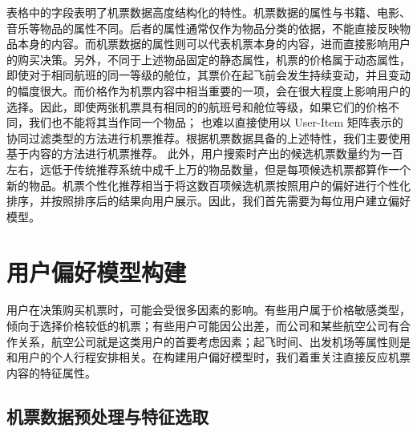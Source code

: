 表格中的字段表明了机票数据高度结构化的特性。机票数据的属性与书籍、电影、音乐等物品的属性不同。后者的属性通常仅作为物品分类的依据，不能直接反映物品本身的内容。而机票数据的属性则可以代表机票本身的内容，进而直接影响用户的购买决策。另外，不同于上述物品固定的静态属性，机票的价格属于动态属性，即使对于相同航班的同一等级的舱位，其票价在起飞前会发生持续变动，并且变动的幅度很大。而价格作为机票内容中相当重要的一项，会在很大程度上影响用户的选择。因此，即使两张机票具有相同的的航班号和舱位等级，如果它们的价格不同，我们也不能将其当作同一个物品；
也难以直接使用以 User-Item 矩阵表示的协同过滤类型的方法进行机票推荐。根据机票数据具备的上述特性，我们主要使用基于内容的方法进行机票推荐。
此外，用户搜索时产出的候选机票数量约为一百左右，远低于传统推荐系统中成千上万的物品数量，但是每项候选机票都算作一个新的物品。机票个性化推荐相当于将这数百项候选机票按照用户的偏好进行个性化排序，并按照排序后的结果向用户展示。因此，我们首先需要为每位用户建立偏好模型。

\section{用户偏好模型构建}

用户在决策购买机票时，可能会受很多因素的影响。有些用户属于价格敏感类型，倾向于选择价格较低的机票；有些用户可能因公出差，而公司和某些航空公司有合作关系，航空公司就是这类用户的首要考虑因素；起飞时间、出发机场等属性则是和用户的个人行程安排相关。在构建用户偏好模型时，我们着重关注直接反应机票内容的特征属性。

\subsection{机票数据预处理与特征选取}

